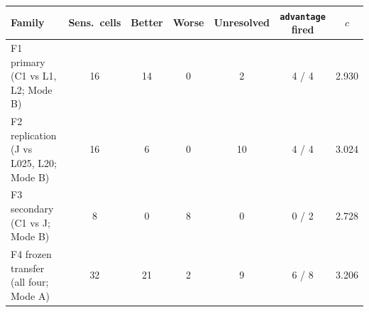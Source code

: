 \begin{tabular}{@{}lcccccc@{}}
\toprule
Family & Sens.\ cells & Better & Worse & Unresolved & \texttt{advantage} fired & $c$ \\
\midrule
F1 primary (C1 vs L1, L2; Mode B) & 16 & 14 & 0 & 2 & 4 / 4 & 2.930 \\
F2 replication (J vs L025, L20; Mode B) & 16 & 6 & 0 & 10 & 4 / 4 & 3.024 \\
F3 secondary (C1 vs J; Mode B) & 8 & 0 & 8 & 0 & 0 / 2 & 2.728 \\
F4 frozen transfer (all four; Mode A) & 32 & 21 & 2 & 9 & 6 / 8 & 3.206 \\
\bottomrule
\end{tabular}

